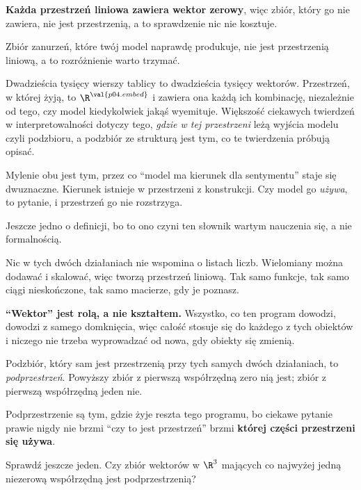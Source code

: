 \begin{fr}

\textbf{Każda przestrzeń liniowa zawiera wektor zerowy}, więc zbiór, który go
nie zawiera, nie jest przestrzenią, a to sprawdzenie nic nie kosztuje.

\begin{aibox}
Zbiór zanurzeń, które twój model naprawdę produkuje, nie jest przestrzenią
liniową, a to rozróżnienie warto trzymać.

Dwadzieścia tysięcy wierszy tablicy to dwadzieścia tysięcy wektorów.
Przestrzeń, w której żyją, to $\R^{\val{p04.embed}}$ i zawiera ona każdą ich
kombinację, niezależnie od tego, czy model kiedykolwiek jakąś wyemituje.
Większość ciekawych twierdzeń w interpretowalności dotyczy tego, \emph{gdzie w
tej przestrzeni} leżą wyjścia modelu \dash{} czyli podzbioru, a podzbiór ze
strukturą jest tym, co te twierdzenia próbują opisać.

Mylenie obu jest tym, przez co \enquote{model ma kierunek dla sentymentu} staje
się dwuznaczne. Kierunek istnieje w przestrzeni z konstrukcji. Czy model go
\emph{używa}, to pytanie, i przestrzeń go nie rozstrzyga.
\end{aibox}
\end{fr}

\begin{fr}
Jeszcze jedno o definicji, bo to ono czyni ten słownik wartym nauczenia się, a
nie formalnością.

Nic w tych dwóch działaniach nie wspomina o listach liczb. Wielomiany można
dodawać i skalować, więc tworzą przestrzeń liniową. Tak samo funkcje, tak samo
ciągi nieskończone, tak samo macierze, gdy je poznasz.

\textbf{\enquote{Wektor} jest rolą, a nie kształtem.} Wszystko, co ten program
dowodzi, dowodzi z samego domknięcia, więc całość stosuje się do każdego z
tych obiektów i niczego nie trzeba wyprowadzać od nowa, gdy obiekty się
zmienią.
\end{fr}

\begin{fr}
Podzbiór, który sam jest przestrzenią przy tych samych dwóch działaniach, to
\emph{podprzestrzeń}. Powyższy zbiór z pierwszą współrzędną zero nią jest;
zbiór z pierwszą współrzędną jeden nie.

Podprzestrzenie są tym, gdzie żyje reszta tego programu, bo ciekawe pytanie
prawie nigdy nie brzmi \enquote{czy to jest przestrzeń} \dash{} brzmi
\textbf{której części przestrzeni się używa}.

Sprawdź jeszcze jeden. Czy zbiór wektorów w $\R^{3}$ mających co najwyżej
jedną niezerową współrzędną jest podprzestrzenią?
\nextframe
\end{fr}

